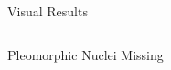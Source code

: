 \documentclass{beamer}
\begin{document}
\begin{frame}{Visual Results }
\begin{columns}
\begin{column}{0.5\textwidth}
{    Pleomorphic Nuclei Missing
    }
    
    \end{column}
    

\end{columns}
\end{frame}
\end{document}
